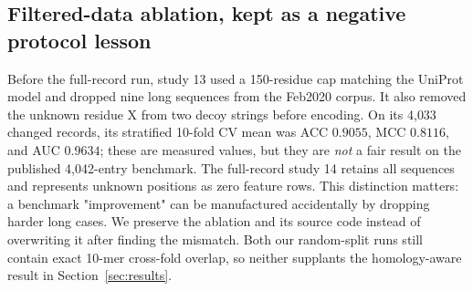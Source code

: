 \subsection{Filtered-data ablation, kept as a negative protocol lesson}
\label{sec:filtered-ablation}
Before the full-record run, study 13 used a 150-residue cap matching the
UniProt model and dropped nine long sequences from the Feb2020 corpus.
It also removed the unknown residue X from two decoy strings before
encoding. On its 4{,}033 changed records, its stratified 10-fold CV mean
was ACC $0.9055$, MCC $0.8116$, and AUC $0.9634$; these are measured
values, but they are \emph{not} a fair result on the published 4{,}042-entry
benchmark. The full-record study 14 retains all sequences and represents
unknown positions as zero feature rows. This distinction matters: a
benchmark "improvement" can be manufactured accidentally by dropping
harder long cases. We preserve the ablation and its source code instead
of overwriting it after finding the mismatch. Both our random-split runs
still contain exact 10-mer cross-fold overlap, so neither supplants the
homology-aware result in Section~\ref{sec:results}.
